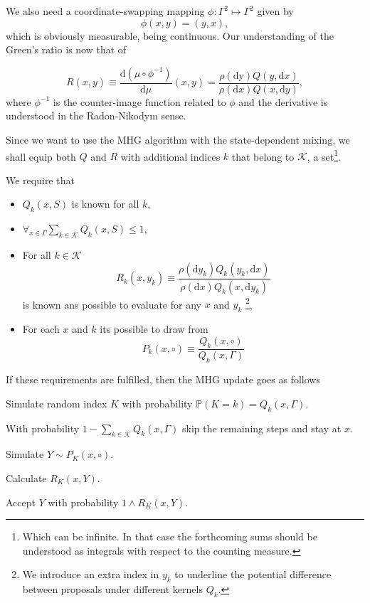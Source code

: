  
We also need a coordinate-swapping mapping $\phi: \Gamma^2 \mapsto \Gamma^2$ given by $$\phi(x,y) = (y,x),$$ which is obviously measurable, being continuous. Our understanding of the Green's ratio is now that of

$$R(x,y) \equiv	\frac{\mathrm{d }(\mu \circ \phi^{-1})}{\mathrm{d }\mu} (x,y) = \frac{\rho(\mathrm{d y} )Q(y, \mathrm{d }x)}{\rho(\mathrm{d }x) Q(x, \mathrm{d }y)},$$
where $\phi^{-1}$ is the counter-image function related to $\phi$ and the derivative is understood in the Radon-Nikodym sense. 

Since we want to use the MHG algorithm with the state-dependent mixing, we shall equip both $Q$ and $R$ with additional indices $k$ that belong to $\mathcal{K}$, a set\footnote{Which can be infinite. In that case the forthcoming sums should be understood as integrals with respect to the counting measure.}.  

We require that

\begin{itemize}
	\item $Q_k (x,S)$ is known for all $k$,
	\item $\forall_{x \in \Gamma} \underset{ k \in \mathcal{K}}{\sum} Q_k (x,S) \leq 1$,
	\item For all $k \in \mathcal{K}$ $$R_k (x,y_k) \equiv \frac{\rho(\mathrm{d } y_k)Q_k (y_k, \mathrm{d }x)}{\rho(\mathrm{d } x)Q_k (x, \mathrm{d }y_k)}$$ is known ans possible to evaluate for any $x$ and $y_k$ \footnote{We introduce an extra index in $y_k$ to underline the potential difference between proposals under different kernels $Q_k$.},
	\item For each $x$ and $k$ its possible to draw from $$P_k(x, \circ) \equiv \frac{Q_k (x, \circ)}{Q_k (x, \Gamma)}$$
\end{itemize}

If these requirements are fulfilled, then the MHG update goes as follows

\begin{algorithm}
	\item Simulate random index $K$ with probability $\mathbb{P}( K = k ) = Q_k (x,\Gamma)$.
	\item[] With probability $1-\underset{k \in \mathcal{K}}{\sum} Q_k (x,\Gamma)$ skip the remaining steps and stay at $x$.
	\item Simulate $Y \sim P_K (x, \circ)$.
	\item Calculate $R_K (x,Y)$.
	\item Accept $Y$ with probability $1\wedge R_K (x,Y)$.
\end{algorithm}

